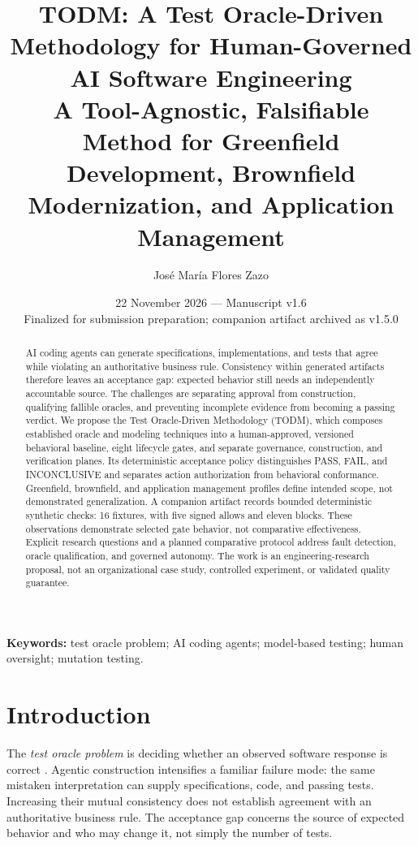 \documentclass[11pt,a4paper]{article}
\title{\textbf{TODM: A Test Oracle-Driven Methodology for Human-Governed AI Software Engineering}\\[5pt]\large A Tool-Agnostic, Falsifiable Method for Greenfield Development, Brownfield Modernization, and Application Management}
\author{Jos\'e Mar\'ia Flores Zazo}
\date{22 November 2026 --- Manuscript v1.6\\\small Finalized for submission preparation; companion artifact archived as v1.5.0}
\begin{document}
\maketitle
\vspace{-1.3em}
\begin{abstract}
AI coding agents can generate specifications, implementations, and tests that agree while violating an authoritative business rule. Consistency within generated artifacts therefore leaves an acceptance gap: expected behavior still needs an independently accountable source. The challenges are separating approval from construction, qualifying fallible oracles, and preventing incomplete evidence from becoming a passing verdict. We propose the Test Oracle-Driven Methodology (TODM), which composes established oracle and modeling techniques into a human-approved, versioned behavioral baseline, eight lifecycle gates, and separate governance, construction, and verification planes. Its deterministic acceptance policy distinguishes PASS, FAIL, and INCONCLUSIVE and separates action authorization from behavioral conformance. Greenfield, brownfield, and application management profiles define intended scope, not demonstrated generalization. A companion artifact records bounded deterministic synthetic checks: 16 fixtures, with five signed allows and eleven blocks. These observations demonstrate selected gate behavior, not comparative effectiveness. Explicit research questions and a planned comparative protocol address fault detection, oracle qualification, and governed autonomy. The work is an engineering-research proposal, not an organizational case study, controlled experiment, or validated quality guarantee.
\end{abstract}
\noindent\textbf{Keywords:} test oracle problem; AI coding agents; model-based testing; human oversight; mutation testing.

\section{Introduction}\label{sec:introduction}
The \emph{test oracle problem} is deciding whether an observed software response is correct \cite{barr2015oracle}. Agentic construction intensifies a familiar failure mode: the same mistaken interpretation can supply specifications, code, and passing tests. Increasing their mutual consistency does not establish agreement with an authoritative business rule. The acceptance gap concerns the source of expected behavior and who may change it, not simply the number of tests.
\end{document}
